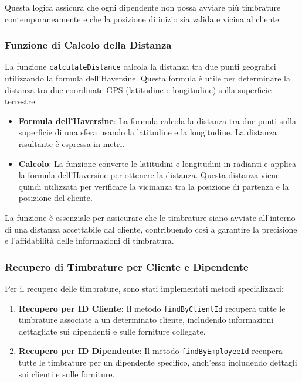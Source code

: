 \documentclass[twoside]{supsistudent}
\begin{document}
Questa logica assicura che ogni dipendente non possa avviare più timbrature contemporaneamente e che la posizione di inizio sia valida e vicina al cliente.

\subsubsection{Funzione di Calcolo della Distanza}

La funzione \texttt{calculateDistance} calcola la distanza tra due punti geografici utilizzando la formula dell'Haversine. Questa formula è utile per determinare la distanza tra due coordinate GPS (latitudine e longitudine) sulla superficie terrestre.

\begin{itemize}
  \item \textbf{Formula dell'Haversine}: La formula calcola la distanza tra due punti sulla superficie di una sfera usando la latitudine e la longitudine. La distanza risultante è espressa in metri.
  \item \textbf{Calcolo}: La funzione converte le latitudini e longitudini in radianti e applica la formula dell'Haversine per ottenere la distanza. Questa distanza viene quindi utilizzata per verificare la vicinanza tra la posizione di partenza e la posizione del cliente.
\end{itemize}

La funzione è essenziale per assicurare che le timbrature siano avviate all'interno di una distanza accettabile dal cliente, contribuendo così a garantire la precisione e l'affidabilità delle informazioni di timbratura.

\subsubsection{Recupero di Timbrature per Cliente e Dipendente}

Per il recupero delle timbrature, sono stati implementati metodi specializzati:

\begin{enumerate}
  \item \textbf{Recupero per ID Cliente}: Il metodo \texttt{findByClientId} recupera tutte le timbrature associate a un determinato cliente, includendo informazioni dettagliate sui dipendenti e sulle forniture collegate.
  \item \textbf{Recupero per ID Dipendente}: Il metodo \texttt{findByEmployeeId} recupera tutte le timbrature per un dipendente specifico, anch'esso includendo dettagli sui clienti e sulle forniture.
\end{enumerate}
\end{document}
